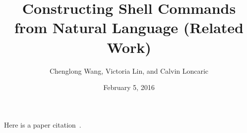 \documentclass[10pt]{article}
\title{Constructing Shell Commands from Natural Language (Related Work)}
\author{Chenglong Wang, Victoria Lin, and Calvin Loncaric}
\date{February 5, 2016}
\begin{document}
\maketitle

Here is a paper citation~\cite{DBLP:journals/corr/DesaiGHJKMRR15}.



\end{document}
